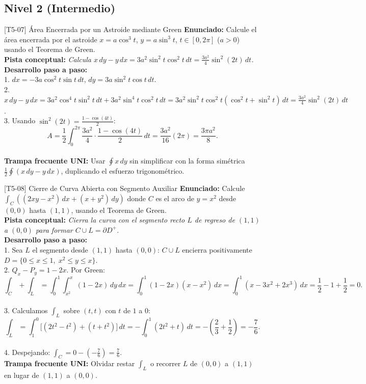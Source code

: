 \documentclass[11pt,a4paper]{article}
\begin{document}
\subsection{Nivel 2 (Intermedio)}

\begin{ejerciciobox}{[T5-07] Área Encerrada por un Astroide mediante Green}
\textbf{Enunciado:} Calcule el área encerrada por el astroide $x = a\cos^3 t$, $y = a\sin^3 t$, $t \in [0, 2\pi]$ ($a > 0$) usando el Teorema de Green.\\[0.2cm]
\textbf{Pista conceptual:} \emph{Calcula $x\,dy - y\,dx = 3a^2\sin^2 t\cos^2 t\,dt = \frac{3a^2}{4}\sin^2(2t)\,dt$.}\\[0.2cm]
\textbf{Desarrollo paso a paso:}\\
1. $dx = -3a\cos^2 t\sin t\,dt$, $dy = 3a\sin^2 t\cos t\,dt$.\\
2. $x\,dy - y\,dx = 3a^2\cos^4 t\sin^2 t\,dt + 3a^2\sin^4 t\cos^2 t\,dt = 3a^2\sin^2 t\cos^2 t(\cos^2 t + \sin^2 t)\,dt = \frac{3a^2}{4}\sin^2(2t)\,dt$.\\
3. Usando $\sin^2(2t) = \frac{1 - \cos(4t)}{2}$:\\
$$A = \frac{1}{2}\int_0^{2\pi} \frac{3a^2}{4}\cdot\frac{1-\cos(4t)}{2}\,dt = \frac{3a^2}{16}(2\pi) = \frac{3\pi a^2}{8}.$$\\[0.2cm]
\textbf{Trampa frecuente UNI:} Usar $\oint x\,dy$ sin simplificar con la forma simétrica $\frac{1}{2}\oint(x\,dy-y\,dx)$, duplicando el esfuerzo trigonométrico.
\end{ejerciciobox}

\begin{ejerciciobox}{[T5-08] Cierre de Curva Abierta con Segmento Auxiliar}
\textbf{Enunciado:} Calcule $\int_C \left((2xy - x^2)\,dx + (x + y^2)\,dy\right)$ donde $C$ es el arco de $y = x^2$ desde $(0,0)$ hasta $(1,1)$, usando el Teorema de Green.\\[0.2cm]
\textbf{Pista conceptual:} \emph{Cierra la curva con el segmento recto $L$ de regreso de $(1,1)$ a $(0,0)$ para formar $C \cup L = \partial D^+$.}\\[0.2cm]
\textbf{Desarrollo paso a paso:}\\
1. Sea $L$ el segmento desde $(1,1)$ hasta $(0,0)$: $C \cup L$ encierra positivamente $D = \{0\le x\le 1,\; x^2 \le y \le x\}$.\\
2. $Q_x - P_y = 1 - 2x$. Por Green:\\
$$\int_C + \int_L = \int_0^1 \int_{x^2}^x (1 - 2x)\,dy\,dx = \int_0^1 (1-2x)(x - x^2)\,dx = \int_0^1 (x - 3x^2 + 2x^3)\,dx = \frac{1}{2} - 1 + \frac{1}{2} = 0.$$\\
3. Calculamos $\int_L$ sobre $(t, t)$ con $t$ de $1$ a $0$:\\
$$\int_L = \int_1^0 \big[(2t^2-t^2) + (t+t^2)\big]\,dt = -\int_0^1 (2t^2 + t)\,dt = -\left(\frac{2}{3} + \frac{1}{2}\right) = -\frac{7}{6}.$$\\
4. Despejando: $\int_C = 0 - \left(-\frac{7}{6}\right) = \frac{7}{6}$.\\[0.2cm]
\textbf{Trampa frecuente UNI:} Olvidar restar $\int_L$ o recorrer $L$ de $(0,0)$ a $(1,1)$ en lugar de $(1,1)$ a $(0,0)$.
\end{ejerciciobox}
\end{document}
